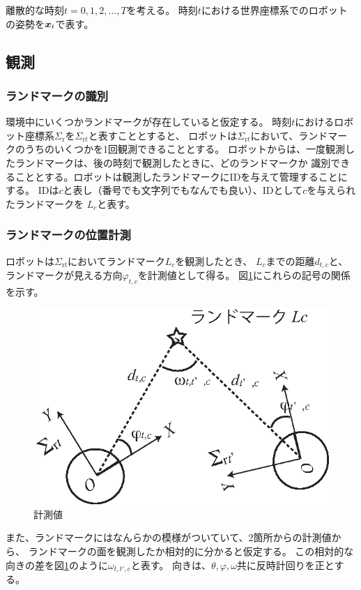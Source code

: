 
離散的な時刻$t = 0,1,2,\dots,T$を考える。
時刻$t$における世界座標系でのロボットの姿勢を$\boldsymbol{x}_t$で表す。

\subsection{観測}

\subsubsection{ランドマークの識別}

環境中にいくつかランドマークが存在していると仮定する。
時刻$t$におけるロボット座標系$\Sigma_\text{r}$を$\Sigma_{\text{r}t}$と表すこととすると、
ロボットは$\Sigma_{\text{r}t}$において、ランドマークのうちのいくつかを1回観測できることとする。
ロボットからは、一度観測したランドマークは、後の時刻で観測したときに、どのランドマークか
識別できることとする。ロボットは観測したランドマークにIDを与えて管理することにする。
IDは$c$と表し（番号でも文字列でもなんでも良い）、IDとして$c$を与えられたランドマークを
$L_c$と表す。

\subsubsection{ランドマークの位置計測}

ロボットは$\Sigma_{\text{r}t}$においてランドマーク$L_c$を観測したとき、
$L_c$までの距離$d_{t,c}$と、ランドマークが見える方向$\varphi_{t,c}$を計測値として得る。
図\ref{fig:observation}にこれらの記号の関係を示す。

\begin{figure}[htbp]
	\begin{center}
		\includegraphics[width=0.5\linewidth]{./figs/observation.eps}
		\caption{計測値}
		\label{fig:observation}
	\end{center}
\end{figure}

また、ランドマークにはなんらかの模様がついていて、2箇所からの計測値から、
ランドマークの面を観測したか相対的に分かると仮定する。
この相対的な向きの差を図\ref{fig:observation}のように$\omega_{t,t',c}$と表す。
向きは、$\theta, \varphi, \omega$共に反時計回りを正とする。

